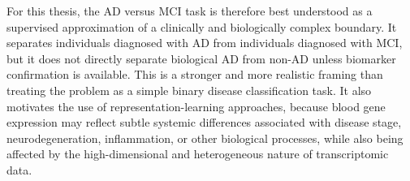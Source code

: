 For this thesis, the AD versus MCI task is therefore best understood as a supervised approximation of a clinically and biologically complex boundary. It separates individuals diagnosed with AD from individuals diagnosed with MCI, but it does not directly separate biological AD from non-AD unless biomarker confirmation is available. This is a stronger and more realistic framing than treating the problem as a simple binary disease classification task. It also motivates the use of representation-learning approaches, because blood gene expression may reflect subtle systemic differences associated with disease stage, neurodegeneration, inflammation, or other biological processes, while also being affected by the high-dimensional and heterogeneous nature of transcriptomic data.
